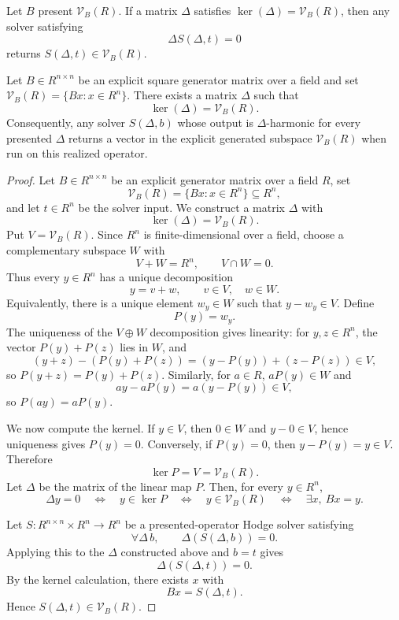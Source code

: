 Let \(B\) present \(\mathcal V_B(R)\). If a matrix
\(\Delta\) satisfies \(\ker(\Delta)=\mathcal V_B(R)\), then any solver satisfying
\[
  \Delta S(\Delta,t)=0
\]
returns \(S(\Delta,t)\in\mathcal V_B(R)\).

\begin{proposition}\label{prop:hcp-to-cvp}
  Let \(B\in R^{n\times n}\) be an explicit square generator matrix over a
  field and set
  \(\mathcal V_B(R)=\{Bx:x\in R^n\}\). There exists a matrix \(\Delta\) such that
  \[
    \ker(\Delta)=\mathcal V_B(R) .
  \]
  Consequently, any solver \(S(\Delta,b)\) whose output is
  \(\Delta\)-harmonic for every
  presented \(\Delta\) returns a vector in the explicit generated subspace
  \(\mathcal V_B(R)\) when run on this realized operator.
\end{proposition}

\begin{proof}
  Let \(B\in R^{n\times n}\) be an explicit generator matrix over a field
  \(R\), set
    \[
      \mathcal V_B(R)=\{Bx:x\in R^n\}\subseteq R^n,
    \]
    and let \(t\in R^n\) be the solver input. We construct a matrix \(\Delta\)
    with
  \[
    \ker(\Delta)=\mathcal V_B(R).
  \]
  Put \(V=\mathcal V_B(R)\). Since \(R^n\) is finite-dimensional over a field,
  choose a complementary subspace \(W\) with
  \[
    V+W=R^n,
    \qquad
    V\cap W=0 .
  \]
  Thus every \(y\in R^n\) has a unique decomposition
  \[
    y=v+w,
    \qquad
    v\in V,\quad w\in W.
  \]
  Equivalently, there is a unique element \(w_y\in W\) such that
  \(y-w_y\in V\). Define
  \[
    P(y)=w_y.
  \]
  The uniqueness of the \(V\oplus W\) decomposition gives linearity: for
  \(y,z\in R^n\), the vector \(P(y)+P(z)\) lies in \(W\), and
  \[
    (y+z)-(P(y)+P(z))
    =
    (y-P(y))+(z-P(z))\in V,
  \]
  so \(P(y+z)=P(y)+P(z)\). Similarly, for \(a\in R\),
  \(aP(y)\in W\) and
  \[
    ay-aP(y)=a(y-P(y))\in V,
  \]
  so \(P(ay)=aP(y)\).

  We now compute the kernel. If \(y\in V\), then \(0\in W\) and \(y-0\in V\),
  hence uniqueness gives \(P(y)=0\). Conversely, if \(P(y)=0\), then
  \(y-P(y)=y\in V\). Therefore
  \[
    \ker P=V=\mathcal V_B(R).
  \]
  Let \(\Delta\) be the matrix of the linear map \(P\). Then, for every
  \(y\in R^n\),
  \[
    \Delta y=0
    \quad\Longleftrightarrow\quad
    y\in\ker P
    \quad\Longleftrightarrow\quad
    y\in\mathcal V_B(R)
    \quad\Longleftrightarrow\quad
    \exists x,\ Bx=y .
  \]

    Let \(S:R^{n\times n}\times R^n\to R^n\) be a presented-operator Hodge
  solver satisfying
  \[
    \forall \Delta\, b,\qquad
    \Delta(S(\Delta,b))=0.
  \]
    Applying this to the \(\Delta\) constructed above and \(b=t\) gives
  \[
    \Delta(S(\Delta,t))=0.
  \]
  By the kernel calculation, there exists \(x\) with
  \[
    Bx=S(\Delta,t).
  \]
    Hence \(S(\Delta,t)\in\mathcal V_B(R)\).
\end{proof}

